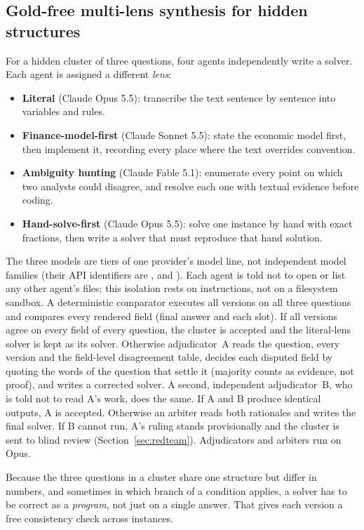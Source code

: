 \documentclass[conference]{IEEEtran}
\begin{document}
\subsection{Gold-free multi-lens synthesis for hidden structures}\label{sec:hidden}
For a hidden cluster of three questions, four agents independently write a solver. Each agent is assigned a different
\emph{lens}:
\begin{itemize}
\item \textbf{Literal} (Claude Opus 5.5): transcribe the text sentence by sentence into variables and rules.
\item \textbf{Finance-model-first} (Claude Sonnet 5.5): state the economic model first, then implement it, recording every
place where the text overrides convention.
\item \textbf{Ambiguity hunting} (Claude Fable 5.1): enumerate every point on which two analysts could disagree, and resolve
each one with textual evidence before coding.
\item \textbf{Hand-solve-first} (Claude Opus 5.5): solve one instance by hand with exact fractions, then write a solver that
must reproduce that hand solution.
\end{itemize}
The three models are tiers of one provider's model line, not independent model families (their API identifiers
are ,  and ).
Each agent is told not to open or list any other agent's files; this isolation rests on instructions, not on a
filesystem sandbox. A deterministic comparator executes all versions on
all three questions and compares every rendered field (final answer and each slot). If all versions agree on every field
of every question, the cluster is accepted and the literal-lens solver is kept as its solver. Otherwise adjudicator~A
reads the question, every version and the
field-level disagreement table, decides each disputed field by quoting the words of the question that settle it
(majority counts as evidence, not proof), and writes a corrected solver. A second, independent adjudicator~B, who is
told not to read A's work, does the same. If A and B produce identical outputs, A is accepted. Otherwise an arbiter
reads both
rationales and writes the final solver. If B cannot run, A's ruling stands provisionally and the cluster is sent to
blind review (Section~\ref{sec:redteam}). Adjudicators and arbiters run on Opus.

Because the three questions in a cluster share one structure but differ in numbers, and sometimes in which branch of a
condition applies, a solver has to be correct as a \emph{program}, not just on a single answer. That gives each
version a free consistency check across instances.
\end{document}

